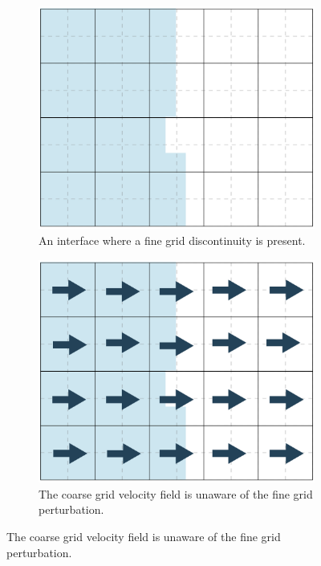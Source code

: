 \begin{figure}[htbp]
	\centering
	\begin{subfigure}{.3\textwidth}
		\centering
		\includegraphics[width=1.0\linewidth]{figs/fgvel1.png}
		\caption{An interface where a fine grid discontinuity is present.}
		\label{fig:fgVel1}
	\end{subfigure}%
	\hfill
	\begin{subfigure}{0.3\textwidth}
		\centering
		\includegraphics[width=1.0\linewidth]{figs/fgvel2.png}
		\caption{The coarse grid velocity field is unaware of the fine grid perturbation.}
		\label{fig:fgVel2}

\end{subfigure}
\end{figure}
